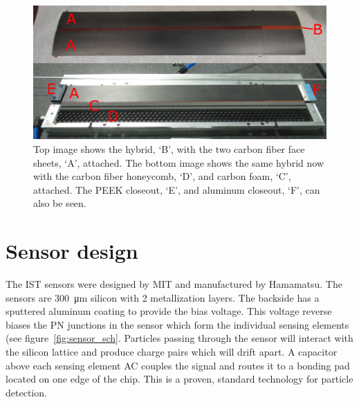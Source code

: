 \documentclass[1p,12pt]{elsarticle}
\begin{document}
\begin{figure}[h]
\begin{center}
\includegraphics[width=5.5in, keepaspectratio=true, angle=0]{graphics/stave_assmb.jpg}
\caption{Top image shows the hybrid, `B', with the two carbon fiber face sheets, `A', attached.
The bottom image shows the same hybrid now with the carbon fiber honeycomb, `D', and 
carbon foam, `C', attached. The PEEK closeout, `E', and aluminum closeout, `F', can also be seen.
\label{fig:stave_assmb}}
\end{center}
\end{figure}
%
\section{Sensor design}
The IST sensors were designed by MIT and
manufactured by Hamamatsu. The sensors are \SI{300}{\micro\meter} silicon with 2 metallization
layers. The backside has a sputtered aluminum coating to provide the bias voltage.
This voltage reverse biases the PN junctions in the sensor which form the individual
sensing elements (see figure~\ref{fig:sensor_sch}. Particles passing through the sensor will interact
with the silicon lattice and produce charge pairs which will drift apart. A capacitor
above each sensing element AC couples the signal and routes it to a bonding pad
located on one edge of the chip. This is a proven, standard technology for
particle detection.
\end{document}
